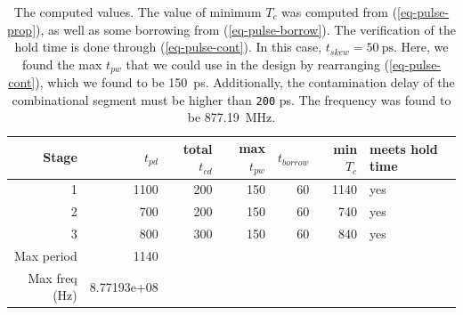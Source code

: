 \documentclass[hidelinks, 12pt]{article}
\begin{document}
\begin{table}[htbp]
\caption{\label{tab-q2-2}The computed values. The value of minimum \(T_{c}\) was computed from (\ref{eq-pulse-prop}), as well as some borrowing from (\ref{eq-pulse-borrow}). The verification of the hold time is done through (\ref{eq-pulse-cont}). In this case, \(t_{skew}=\qty{50}{\pico\s}\). Here, we found the max \(t_{pw}\) that we could use in the design by rearranging (\ref{eq-pulse-cont}), which we found to be \qty{150}{\pico\s}. Additionally, the contamination delay of the combinational segment must be higher than \texttt{200} \unit{\pico\s}. The frequency was found to be \qty{877.19}{\mega\hertz}.}
\centering
\begin{tabular}{rrrrrrl}
Stage & \(t_{pd}\) & total \(t_{cd}\) & max \(t_{pw}\) & \(t_{borrow}\) & min \(T_{c}\) & meets hold time\\
\hline
1 & 1100 & 200 & 150 & 60 & 1140 & yes\\
2 & 700 & 200 & 150 & 60 & 740 & yes\\
3 & 800 & 300 & 150 & 60 & 840 & yes\\
\hline
Max period & 1140 &  &  &  &  & \\
Max freq (\unit{\hertz}) & 8.77193e+08 &  &  &  &  & \\
\end{tabular}
\end{table}
\end{document}
